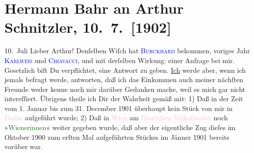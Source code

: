 

               \section[Hermann Bahr an Arthur Schnitzler, 10. 7. {[}1902{]}]{ Hermann Bahr an Arthur Schnitzler, 10. 7. {[}1902{]}}\nopagebreak{}\rehead{ }\normalsize\beginnumbering{} \toendnotes[C]{\smallbreak\pagebreak[2]} 
\pstart
           \raggedleft{}{\pb}10. Juli\pend
           \pstart\center{}Lieber Arthur!\pend\pstart
           Denſelben Wiſch hat \textcolor{blue}{\textsc{Burckhard}}{}\ledrightnote{\textcolor{blue}{Max Eugen Burckhard}} bekommen, voriges Jahr \textcolor{blue}{\textsc{Karlweis}}{}\ledrightnote{\textcolor{blue}{Carl Karlweis}} und \textcolor{blue}{\textsc{Chiavacci}}{}\ledrightnote{\textcolor{blue}{Vincenz Chiavacci}}, und mit derſelben Wirkung: einer
               Anfrage bei mir. Gesetzlich biſt Du verpflichtet, eine Antwort zu geben. \uline{Ich} werde aber, wenn ich jemals befragt werde,
               antworten, daß ich das Einkommen {\pb}auch meiner
               nächſten Freunde weder kenne noch mir darüber Gedanken mache, weil es mich gar nicht
               intereſſiert.\pend
           \pstart
           Übrigens theile ich Dir der Wahrheit gemäß mit: 1) Daß in der Zeit vom 1. Januar bis
               zum 31. December 1901 überhaupt kein Stück von mir in \textcolor{pink}{Berlin}{}\ledrightnote{\textcolor{pink}{Berlin}} aufgeführt wurde; {\pb}2) Daß in \textcolor{pink}{Wien}{}\ledrightnote{\textcolor{pink}{Wien}} am \textcolor{pink}{Deutſchen
                  Volkstheater}{}\ledrightnote{\textcolor{pink}{Volkstheater}} noch »\textcolor{green}{Wienerinnen}{}\ledrightnote{\textcolor{green}{Wienerinnen}}« weiter
               gegeben wurde, daß aber der eigentliche Zug dieſes im Oktober 1900 zum erſten Mal
               aufgeführten Stückes im Jänner 1901 bereits vorüber war.\pend
